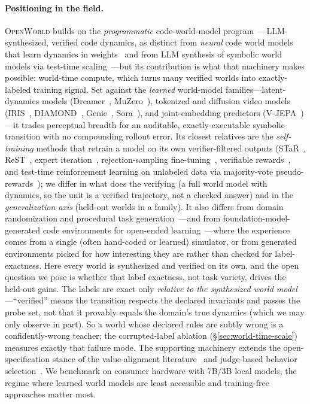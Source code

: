 \documentclass[11pt]{article}
\newcommand{\openworld}{\textsc{OpenWorld}}
\begin{document}
\paragraph{Positioning in the field.} \openworld{} builds on the \emph{programmatic} code-world-model
program~\cite{worldcoder2024,gifmcts2024,poeworld2025,cwmgames2025}---LLM-synthesized, verified
code dynamics, as distinct from \emph{neural} code world models that learn dynamics in
weights~\cite{metacwm2025} and from LLM synthesis of symbolic world models via test-time
scaling~\cite{ivml2025}---but its contribution is what that machinery makes possible: world-time compute,
which turns many verified worlds into exactly-labeled training signal. Set against the
\emph{learned} world-model families---latent-dynamics models (Dreamer~\cite{dreamerv3},
MuZero~\cite{muzero}), tokenized and diffusion video models (IRIS~\cite{iris2023},
DIAMOND~\cite{diamond2024}, Genie~\cite{genie2024}, Sora~\cite{sora2024}), and
joint-embedding predictors (V-JEPA~\cite{vjepa2025})---it trades perceptual breadth for an
auditable, exactly-executable symbolic transition with no compounding rollout error. Its closest relatives
are the \emph{self-training} methods that retrain a model on its own verifier-filtered outputs
(STaR~\cite{star2022}, ReST~\cite{rest2023,restem2024}, expert iteration~\cite{expertiteration2017},
rejection-sampling fine-tuning~\cite{rft2023}, verifiable rewards~\cite{rlvr2024}, and test-time
reinforcement learning on unlabeled data via majority-vote pseudo-rewards~\cite{ttrl2025}); we differ in
what does the verifying (a full world model with dynamics, so the unit is a verified trajectory, not
a checked answer) and in the \emph{generalization axis} (held-out worlds in a family). It also
differs from domain randomization and procedural task generation~\cite{tobin2017dr,cobbe2020procgen,openended2021xland}---and
from foundation-model-generated code environments for open-ended learning~\cite{omniepic2024}---where
the experience comes from a single (often hand-coded or learned) simulator, or from generated
environments picked for how interesting they are rather than checked for label-exactness. Here every
world is synthesized and
verified on its own, and the open question we pose is whether that label exactness, not task
variety, drives the held-out gains. The labels are
exact only \emph{relative to the synthesized world model}---``verified'' means the transition
respects the declared invariants and passes the probe set, not that it provably equals the
domain's true dynamics (which we may only observe in part). So a world whose declared rules are subtly wrong is
a confidently-wrong teacher; the corrupted-label ablation (\S\ref{sec:world-time-scale})
measures exactly that failure mode. The supporting machinery extends the open-specification
stance of the value-alignment literature~\cite{spectrap2025,mas2025} and judge-based
behavior selection~\cite{agentasjudge2024}. We benchmark on consumer hardware with 7B/3B
local models, the regime where learned world models are least accessible and training-free
approaches matter most.
\end{document}
